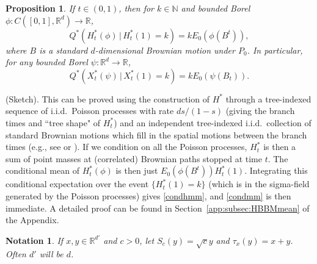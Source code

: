 \documentclass[12pt]{article}
\makeatletter
\renewenvironment{proof}[1][\proofname]{%
\par\pushQED{\qed}\normalfont%
\topsep6\p@\@plus6\p@\relax
\trivlist\item[\hskip\labelsep\bfseries#1\@addpunct{.}]%
\ignorespaces
}{%
\popQED\endtrivlist\@endpefalse
}
\newtheorem{proposition}[theorem]{Proposition}
\numberwithin{theorem}{section}
\theoremstyle{def}
\newtheorem*{notation}{Notation}
\numberwithin{equation}{section}
\newcommand{\R}{\mathbb{R}}
\newcommand{\N}{\mathbb{N}}
\newcommand{\ARXIV}[1]{#1}
\makeatother
\begin{document}
\begin{proposition}\label{HBBMmean} 
If $t\in(0,1)$, then for $k\in\N$ and bounded Borel $\phi:C([0,1],\R^d)\to \R$,
\begin{equation}\label{condhmm}
Q^*(H^*_t(\phi) \, | \, H^*_t(1)=k)=kE_0(\phi(B^t)),
\end{equation}
where $B$ is a standard $d$-dimensional Brownian motion under $P_0$.  In particular, for any bounded Borel $\psi:\R^d\to\R$, 
\begin{equation}\label{condmm}
Q^*(X^*_t(\psi) \, | \, X^*_t(1)=k)=kE_0(\psi(B_t)).
\end{equation}
\end{proposition}
\begin{proof} (Sketch). This can be proved using the construction of $H^*$ through a tree-indexed sequence of i.i.d.\  Poisson processes with rate $ds/(1-s)$ (giving the branch times and ``tree shape" of $H^*_t$) and an independent tree-indexed i.i.d.\ collection of standard Brownian motions which fill in the spatial motions between the branch times (e.g., see \cite{JB} or \cite{W86}).  If we condition on all the Poisson processes, $H^*_t$ is then a sum of point masses at (correlated) Brownian paths stopped at time $t$.  The conditional mean of $H^*_t(\phi)$ is then just $E_0(\phi(B^t))H^*_t(1)$. Integrating this conditional expectation over the event $\{H^*_t(1)=k\}$ (which is in the sigma-field generated by the Poisson processes) gives \eqref{condhmm}, and \eqref{condmm} is then immediate.  
\ARXIV{A detailed proof can be found in Section~\ref{app:subsec:HBBMmean} of the Appendix.}
\end{proof}


\begin{notation} If $x,y\in\R^{d'}$ and $c>0$, let $S_c(y)=\sqrt c y$ and $\tau_x(y)=x+y$. Often $d'$ will be $d$.%
\end{notation} 
\end{document}
